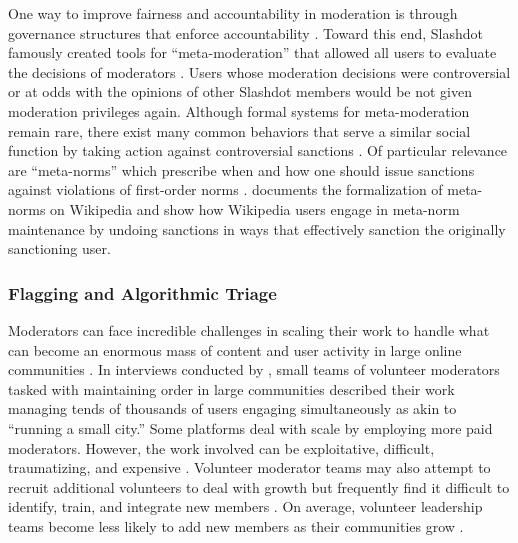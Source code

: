 \documentclass[format=acmsmall, natbib=true,  screen=true]{acmart}
\begin{document}
One way to improve fairness and accountability in moderation is through governance structures that enforce accountability \citep{frey_this_2019}.
Toward this end, Slashdot famously created tools for ``meta-moderation'' that allowed all users to evaluate the decisions of moderators \cite{lampe_slashdot_2004}. Users whose moderation decisions were controversial or at odds with the opinions of other Slashdot members would be not given moderation privileges again.
Although formal systems for meta-moderation remain rare, there exist many common behaviors that serve a similar social function by taking action against controversial sanctions \citep{crawford_what_2016}.    
Of particular relevance are ``meta-norms'' which prescribe when and how one should issue sanctions against violations of first-order norms \cite{horne_enforcement_2001}.  \citet{reagle_be_2010} documents the formalization of meta-norms on Wikipedia and \citet{piskorski_testing_2017} show how Wikipedia users engage in meta-norm maintenance by undoing sanctions in ways that effectively sanction the originally sanctioning user.

\subsubsection{Flagging and Algorithmic Triage}

Moderators can face incredible challenges in scaling their work to handle what can become an enormous mass of content and user activity in large online communities \citep{gillespie_custodians_2018, kiene_technological_2019,seering_moderator_2019,seering_shaping_2017}. In interviews conducted by \citet{kiene_technological_2019}, small teams of volunteer moderators tasked with maintaining order in large communities described their work managing tends of thousands of users engaging simultaneously as akin to ``running a small city.'' 
Some platforms deal with scale by employing more paid moderators. However, the work involved can be exploitative, difficult, traumatizing, and expensive \cite{roberts_commercial_2016}. Volunteer moderator teams may also attempt to recruit additional volunteers to deal with growth but frequently find it difficult to identify, train, and integrate new members \citep{kiene_surviving_2016}. On average, volunteer leadership teams become less likely to add new members as their communities grow \citep{shaw_laboratories_2014}. 
\end{document}
